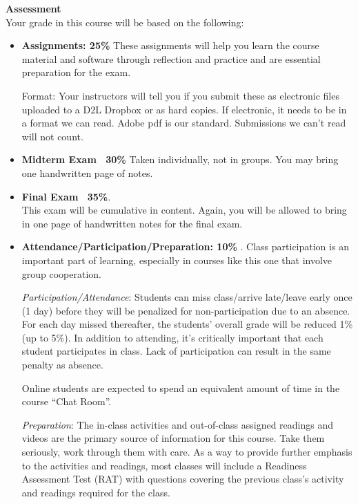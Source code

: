 {\bf Assessment}\\
Your grade in this course will be based on the following: 
\begin{itemize}
\item  {\bf Assignments: 25\%} %
  These assignments  will help you learn
  the course material and software through 
  reflection and practice and are essential preparation for the exam. 

  Format: Your instructors will tell you if you submit these as
  electronic files uploaded to a D2L Dropbox or as hard copies. If electronic,
  it needs to be in a format we can read.  Adobe pdf is our standard.
  Submissions we can't read will not count.


\item {\bf Midterm Exam \  30\%}
  Taken individually, not in groups. You may bring one handwritten
  page of notes.  


\item {\bf Final Exam %
               \  35\%}.\\
  This exam will be cumulative in content. Again, you will be allowed
  to bring in one page of handwritten notes for the final exam.   
 
\item {\bf Attendance/Participation/Preparation:  10\%} . Class
  participation is an important part of learning, especially in
  courses like this one that involve group cooperation.    

  {\it Participation/Attendance}: Students can miss class/arrive
  late/leave early once (1 day) before they will be penalized for
  non-participation due to an absence.  For each day missed
  thereafter, the students’ overall grade will be reduced 1\% (up to
  5\%).   In addition to attending, it's critically important that
  each student participates in class. Lack of participation can result
  in the same penalty as absence.

  Online students are expected to spend an equivalent amount of time
  in the course ``Chat Room''. 


  {\it Preparation}: The in-class activities and out-of-class assigned
  readings  and videos are the primary source of  information for this course.
  Take them seriously, work through them with care.
  As a way to provide further emphasis to the
  activities and readings, most classes will include a Readiness
  Assessment Test (RAT) with questions covering the previous class's
  activity and readings required for the class.   
\end{itemize}

